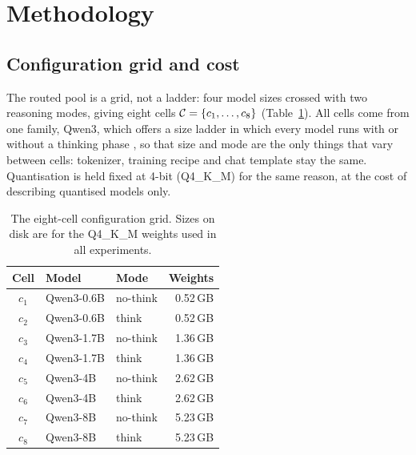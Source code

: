 \section{Methodology}
\label{sec:methodology}

\subsection{Configuration grid and cost}
\label{sec:grid}

The routed pool is a grid, not a ladder: four model sizes crossed with two
reasoning modes, giving eight cells $\mathcal{C} = \{c_1, \dots, c_8\}$
(Table~\ref{tab:grid}). All cells come from one family, Qwen3, which offers a
size ladder in which every model runs with or without a thinking phase
\cite{qwen3}, so that size and mode are the only things that vary between
cells: tokenizer, training recipe and chat template stay the same.
Quantisation is held fixed at 4-bit (Q4\_K\_M) for the same reason, at the
cost of describing quantised models only.

\begin{table}[ht]
\centering
\caption{The eight-cell configuration grid. Sizes on disk are for the
Q4\_K\_M weights used in all experiments.}
\label{tab:grid}
\begin{tabular}{@{}cllr@{}}
\toprule
Cell & Model & Mode & Weights \\
\midrule
$c_1$ & Qwen3-0.6B & no-think & 0.52\,GB \\
$c_2$ & Qwen3-0.6B & think    & 0.52\,GB \\
$c_3$ & Qwen3-1.7B & no-think & 1.36\,GB \\
$c_4$ & Qwen3-1.7B & think    & 1.36\,GB \\
$c_5$ & Qwen3-4B   & no-think & 2.62\,GB \\
$c_6$ & Qwen3-4B   & think    & 2.62\,GB \\
$c_7$ & Qwen3-8B   & no-think & 5.23\,GB \\
$c_8$ & Qwen3-8B   & think    & 5.23\,GB \\
\bottomrule
\end{tabular}
\end{table}

